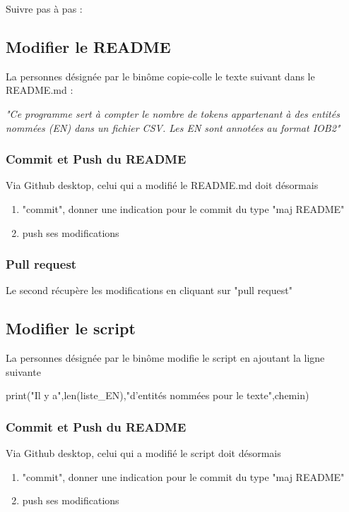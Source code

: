 Suivre pas à pas :

\subsection{Modifier le README}

La personnes désignée par le binôme copie-colle le texte suivant dans le README.md : 


\textit{"Ce programme sert à compter le nombre de tokens appartenant à des entités nommées (EN) dans un fichier CSV. Les EN sont annotées au format IOB2" }

\subsubsection{Commit et Push du README}
Via Github desktop, celui qui a modifié le README.md doit désormais 
\begin{enumerate}
\item "commit", donner une indication pour le commit du type "maj README"
\item push ses modifications
\end{enumerate}

\subsubsection{Pull request}
Le second récupère les modifications en cliquant sur "pull request"

\subsection{Modifier le script}

La personnes désignée par le binôme modifie le script en ajoutant la ligne suivante 

\begin{python}
 print("Il y a",len(liste_EN),"d'entités nommées pour le texte",chemin)
\end{python}
\subsubsection{Commit et Push du README}
Via Github desktop, celui qui a modifié le script doit désormais 
\begin{enumerate}
\item "commit", donner une indication pour le commit du type "maj README"
\item push ses modifications
\end{enumerate}

